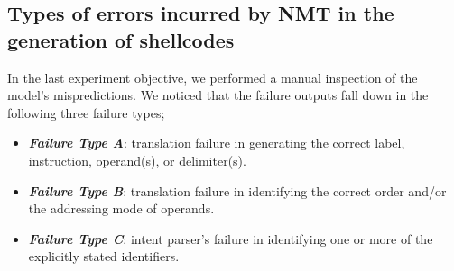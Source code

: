 \begin{comment}
\begin{figure}[ht]
\centering
\texttt{[image: img/kde.pdf]}
    \caption{Density-plots visualizing the statistics, in terms of lines of assembly code, of the  30 shellcodes in the test set. The labels \textit{Fully Correct} and \textit{Incorrect} refer to the shellcodes that are generated by the approach as fully correct () and incorrect (), respectively.}
    \label{fig:shellcode_length}
\end{figure}



\begin{table*}[ht]
\centering
\caption{Descriptive statistics, in terms of lines of assembly code, of the  30 shellcodes in the test set. \textit{Fully Correct} and \textit{Incorrect} refer to the shellcodes that are generated by the approach as fully correct () and incorrect (), respectively. Distribution shows a density plot.}
\label{tab:shellcode_quartiles}
\begin{tabular}{
>{\centering\arraybackslash}m{1.5cm}| 
>{\centering\arraybackslash}m{1cm}
>{\centering\arraybackslash}m{1cm}
>{\centering\arraybackslash}m{1cm}
>{\centering\arraybackslash}m{1cm} |
>{\centering\arraybackslash}m{3cm}}
\toprule
 & \textbf{ Qu.} & \textbf{ Qu.} & \textbf{ Qu.} & \textbf{ Qu.} & \textbf{Distribution}\\
\midrule
& & & & & \multirow{3}{*}[0cm]{\texttt{[image: img/kde2.pdf]}}\0.4cm]
\textit{Incorrect} & 20.75  & 28.50 & 39.00 & 61.00 & 
\0.4cm]
\bottomrule
\end{tabular}
\end{table*}
\end{comment}




\subsection{Types of errors incurred by NMT in the generation of shellcodes}
\label{subsec:RQ4}

In the last experiment objective, we performed a manual inspection of the model's mispredictions. We noticed that the failure outputs fall down in the following three failure types;
\begin{itemize}
    \item \textbf{\textit{Failure Type A}}: translation failure in generating the correct label, instruction, operand(s), or delimiter(s).
    \item \textbf{\textit{Failure Type B}}:  translation failure in identifying the correct order and/or the addressing mode of operands.
    \item \textbf{\textit{Failure Type C}}: intent parser's failure in identifying one or more of the explicitly stated identifiers.
\end{itemize}


